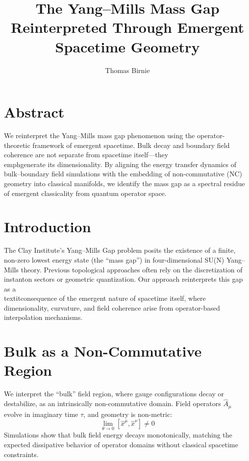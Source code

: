 \documentclass[11pt]{article}
\title{The Yang--Mills Mass Gap Reinterpreted Through Emergent Spacetime Geometry}
\author{Thomas Birnie}
\date{}
\begin{document}
\maketitle

\section*{Abstract}
We reinterpret the Yang--Mills mass gap phenomenon using the operator-theoretic framework of emergent spacetime. Bulk decay and boundary field coherence are not separate from spacetime itself---they \\emph{generate} its dimensionality. By aligning the energy transfer dynamics of bulk--boundary field simulations with the embedding of non-commutative (NC) geometry into classical manifolds, we identify the mass gap as a spectral residue of emergent classicality from quantum operator space.

\section{Introduction}
The Clay Institute's Yang--Mills Gap problem posits the existence of a finite, non-zero lowest energy state (the ``mass gap'') in four-dimensional SU(N) Yang--Mills theory. Previous topological approaches often rely on the discretization of instanton sectors or geometric quantization. Our approach reinterprets this gap as a \\textit{consequence of the emergent nature of spacetime itself}, where dimensionality, curvature, and field coherence arise from operator-based interpolation mechanisms.

\section{Bulk as a Non-Commutative Region}
We interpret the ``bulk'' field region, where gauge configurations decay or destabilize, as an intrinsically non-commutative domain. Field operators \( \hat{A}_\mu \) evolve in imaginary time \( \tau \), and geometry is non-metric:
\begin{equation}
\lim_{\theta \to 0} [\hat{x}^\mu, \hat{x}^\nu] \neq 0
\end{equation}
Simulations show that bulk field energy decays monotonically, matching the expected dissipative behavior of operator domains without classical spacetime constraints.
\end{document}
